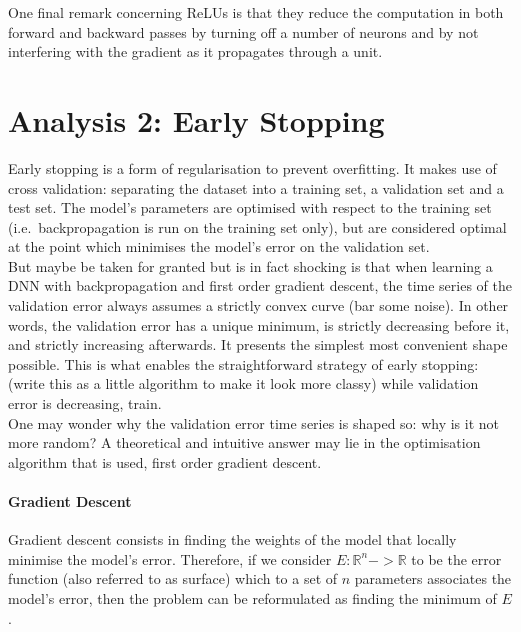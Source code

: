 \documentclass[a4paper,11pt]{article}
\begin{document}
One final remark concerning ReLUs is that they reduce the computation in both forward and backward passes by turning off a number of neurons and by not interfering with the gradient as it propagates through a unit. \\

\clearpage

\section{Analysis 2: Early Stopping}

Early stopping is a form of regularisation to prevent overfitting. It makes use of cross validation: separating the dataset into a training set, a validation set and a test set. The model's parameters are optimised with respect to the training set (i.e.\ backpropagation is run on the training set only), but are considered optimal at the point which minimises the model's error on the validation set. \\

But maybe be taken for granted but is in fact shocking is that when learning a DNN with backpropagation and first order gradient descent, the time series of the validation error always assumes a strictly convex curve (bar some noise). In other words, the validation error has a unique minimum, is strictly decreasing before it, and strictly increasing afterwards. It presents the simplest most convenient shape possible. This is what enables the straightforward strategy of early stopping: (write this as a little algorithm to make it look more classy) while validation error is decreasing, train. \\

One may wonder why the validation error time series is shaped so: why is it not more random? A theoretical and intuitive answer may lie in the optimisation algorithm that is used, first order gradient descent.

\paragraph{Gradient Descent}

Gradient descent consists in finding the weights of the model that locally minimise the model's error. Therefore, if we consider $E : \mathbb{R}^n -> \mathbb{R}$ to be the error function (also referred to as surface) which to a set of $n$ parameters associates the model's error, then the problem can be reformulated as finding the minimum of $E$. 
\end{document}
